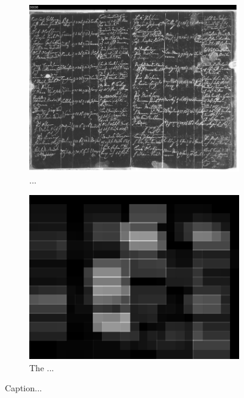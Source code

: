 \begin{figure}
    \centering
    \begin{subfigure}[c]{1.0\textwidth}
        \centering
        \includegraphics[scale=1.0]{resources/Edited/Orig_processed/img_S3HT-64P3-2GW.jpg}
        \caption{...}
    \end{subfigure}
    \begin{subfigure}[c]{1.0\textwidth}
        \centering
        \includegraphics{resources/Edited/Orig_att/att_S3HT-64P3-2GW.jpg}
        \caption{The ...}
    \end{subfigure}
    \caption{Caption...}
    \label{fig:my_label}
\end{figure}